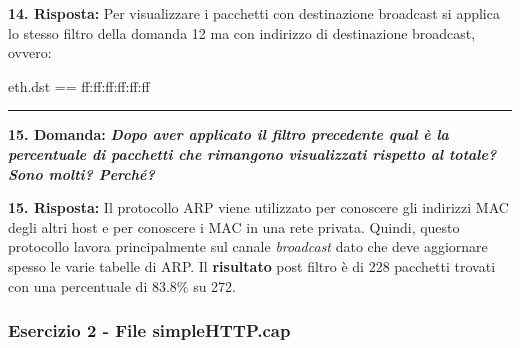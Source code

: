 \documentclass[a4paper]{article}
\newcommand{\longline}{\noindent\rule{\textwidth}{0.4pt}}
\begin{document}
	
	\noindent
	\textcolor{Green4}{\textbf{14. Risposta:}} Per visualizzare i pacchetti con destinazione broadcast si applica lo stesso filtro della domanda 12 ma con indirizzo di destinazione broadcast, ovvero:
	\begin{center}
		\textsf{eth.dst == ff:ff:ff:ff:ff:ff}
	\end{center}
	
	\longline\newline
	
	\noindent
	\textcolor{Red3}{\textbf{15. Domanda:}} \textbf{\emph{Dopo aver applicato il filtro precedente qual è la percentuale di pacchetti che rimangono visualizzati rispetto al totale? Sono molti? Perché?}}\newline
	
	
	\noindent
	\textcolor{Green4}{\textbf{15. Risposta:}} Il protocollo ARP viene utilizzato per conoscere gli indirizzi MAC degli altri host e per conoscere i MAC in una rete privata. Quindi, questo protocollo lavora principalmente sul canale \emph{broadcast} dato che deve aggiornare spesso le varie tabelle di ARP. Il \textbf{risultato} post filtro è di 228 pacchetti trovati con una percentuale di 83.8\% su 272.\newpage
	
	\subsubsection{Esercizio 2 - File \textsf{simpleHTTP.cap}}
	
\end{document}
